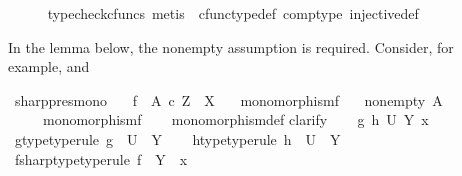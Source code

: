 \begin{isabellebody}
\ \ \ \ \isamarkupfalse%
\ {\isacharparenleft}{\kern0pt}typecheck{\isacharunderscore}{\kern0pt}cfuncs{\isacharcomma}{\kern0pt}\ metis\ \ cfunc{\isacharunderscore}{\kern0pt}type{\isacharunderscore}{\kern0pt}def\ comp{\isacharunderscore}{\kern0pt}type\ injective{\isacharunderscore}{\kern0pt}def{\isacharparenright}{\kern0pt}\isanewline
{}\isamarkupfalse%
%
\endisatagproof
{\isafoldproof}%
%
\isadelimproof
%
\endisadelimproof
%
\begin{isamarkuptext}%
In the lemma below, the nonempty assumption is required.
      Consider, for example,  and %
\end{isamarkuptext}\isamarkuptrue%
\isamarkupfalse%
\ sharp{\isacharunderscore}{\kern0pt}pres{\isacharunderscore}{\kern0pt}mono{\isacharcolon}{\kern0pt}\isanewline
\ \ \ {\isachardoublequoteopen}f\ {\isacharcolon}{\kern0pt}\ A\ {\isasymtimes}\isactrlsub c\ Z\ {\isasymrightarrow}\ X{\isachardoublequoteclose}\isanewline
\ \ \ {\isachardoublequoteopen}monomorphism{\isacharparenleft}{\kern0pt}f{\isacharparenright}{\kern0pt}{\isachardoublequoteclose}\isanewline
\ \ \ {\isachardoublequoteopen}nonempty\ A{\isachardoublequoteclose}\isanewline
\ \ \ \ \ {\isachardoublequoteopen}monomorphism{\isacharparenleft}{\kern0pt}f\isactrlsup {\isasymsharp}{\isacharparenright}{\kern0pt}{\isachardoublequoteclose}\isanewline
%
\isadelimproof
\ \ %
\endisadelimproof
%
\isatagproof
{}\isamarkupfalse%
\ monomorphism{\isacharunderscore}{\kern0pt}def{}\isanewline
{}\isamarkupfalse%
{\isacharparenleft}{\kern0pt}clarify{\isacharparenright}{\kern0pt}\isanewline
\ \ \isamarkupfalse%
\ g\ h\ U\ Y\ x\isanewline
\ \ \isamarkupfalse%
\ g{\isacharunderscore}{\kern0pt}type{\isacharbrackleft}{\kern0pt}type{\isacharunderscore}{\kern0pt}rule{\isacharbrackright}{\kern0pt}{\isacharcolon}{\kern0pt}\ {\isachardoublequoteopen}g\ {\isacharcolon}{\kern0pt}\ U\ {\isasymrightarrow}\ Y{\isachardoublequoteclose}\isanewline
\ \ \isamarkupfalse%
\ h{\isacharunderscore}{\kern0pt}type{\isacharbrackleft}{\kern0pt}type{\isacharunderscore}{\kern0pt}rule{\isacharbrackright}{\kern0pt}{\isacharcolon}{\kern0pt}\ {\isachardoublequoteopen}h\ {\isacharcolon}{\kern0pt}\ U\ {\isasymrightarrow}\ Y{\isachardoublequoteclose}\isanewline
\ \ \isamarkupfalse%
\ f{\isacharunderscore}{\kern0pt}sharp{\isacharunderscore}{\kern0pt}type{\isacharbrackleft}{\kern0pt}type{\isacharunderscore}{\kern0pt}rule{\isacharbrackright}{\kern0pt}{\isacharcolon}{\kern0pt}\ {\isachardoublequoteopen}f\isactrlsup {\isasymsharp}\ {\isacharcolon}{\kern0pt}\ Y\ {\isasymrightarrow}\ x{\isachardoublequoteclose}\isanewline

\end{isabellebody}
